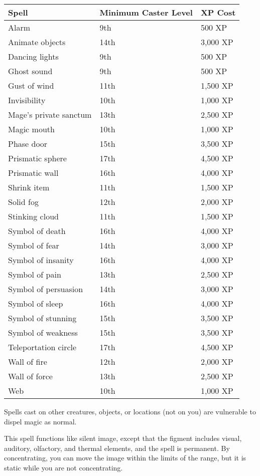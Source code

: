 \begin{multicols}{2}
\begin{small}
\begin{center}
\begin{tabular}[h!]{p{.75in}|p{.5in}l}
Spell & Minimum Caster Level & XP Cost \\ \hline
Alarm & 9th & 500 XP \\
Animate objects & 14th & 3,000 XP	\\
Dancing lights & 9th & 500 XP	\\
Ghost sound & 9th & 500 XP \\
Gust of wind & 11th & 1,500 XP \\
Invisibility & 10th & 1,000 XP \\
Mage's private sanctum & 13th & 2,500 XP \\
Magic mouth & 10th & 1,000 XP	\\
Phase door & 15th & 3,500 XP \\
Prismatic sphere & 17th & 4,500 XP \\
Prismatic wall & 16th & 4,000 XP \\
Shrink item & 11th & 1,500 XP \\
Solid fog & 12th & 2,000 XP \\
Stinking cloud & 11th & 1,500 XP \\
Symbol of death & 16th & 4,000 XP \\
Symbol of fear & 14th & 3,000 XP \\
Symbol of insanity & 16th & 4,000 XP \\
Symbol of pain & 13th & 2,500 XP \\
Symbol of persuasion & 14th & 3,000 XP \\
Symbol of sleep & 16th & 4,000 XP \\
Symbol of stunning & 15th & 3,500 XP \\
Symbol of weakness & 15th & 3,500 XP \\
Teleportation circle & 17th & 4,500 XP \\
Wall of fire & 12th & 2,000 XP \\
Wall of force & 13th & 2,500 XP \\
Web & 10th & 1,000 XP \\
\end{tabular}
\end{center}

\smallskip\noindent Spells cast on other creatures, objects, or locations (not on you) are vulnerable to dispel magic as normal.


\noindent This spell functions like silent image, except that the figment includes visual, auditory, olfactory, and thermal elements, and the spell is permanent. By concentrating, you can move the image within the limits of the range, but it is static while you are not concentrating.


\end{small}
\end{multicols}
